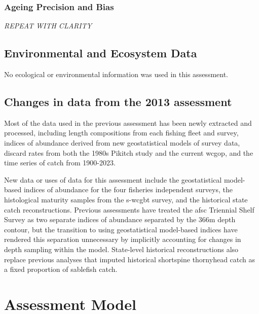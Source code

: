 \documentclass[11pt,
  english,
  letterpaper,
]{article}
\begin{document}
\hypertarget{ageing-precision-and-bias}{%
\subsubsection{Ageing Precision and Bias}\label{ageing-precision-and-bias}}

\emph{REPEAT WITH CLARITY}

\hypertarget{environmental-and-ecosystem-data}{%
\subsection{Environmental and Ecosystem Data}\label{environmental-and-ecosystem-data}}

No ecological or environmental information was used in this assessment.

\hypertarget{changes-in-data-from-the-2013-assessment}{%
\subsection{Changes in data from the 2013 assessment}\label{changes-in-data-from-the-2013-assessment}}

Most of the data used in the previous assessment has been newly extracted and processed, including length compositions from each fishing fleet and survey, indices of abundance derived from new geostatistical models of survey data, discard rates from both the 1980s Pikitch study and the current \gls{wcgop}, and the time series of catch from 1900-2023.

New data or uses of data for this assessment include the geostatistical model-based indices of abundance for the four fisheries independent surveys, the histological maturity samples from the \gls {s-wcgbt} survey, and the historical state catch reconstructions. Previous assessments have treated the \gls{afsc} Triennial Shelf Survey as two separate indices of abundance separated by the 366m depth contour, but the transition to using geostatistical model-based indices have rendered this separation unnecessary by implicitly accounting for changes in depth sampling within the model. State-level historical reconstructions also replace previous analyses that imputed historical shortspine thornyhead catch as a fixed proportion of sablefish catch.

\hypertarget{assessment-model}{%
\section{Assessment Model}\label{assessment-model}}
\end{document}

